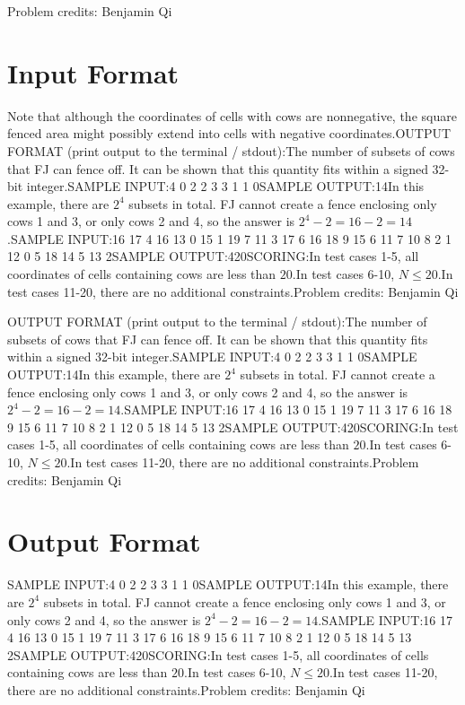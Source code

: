 \documentclass[12pt]{article}
\begin{document}
Problem credits: Benjamin Qi



\section*{Input Format}
Note that although the coordinates of cells with cows are nonnegative, the 
square fenced area might possibly extend into cells with negative coordinates.OUTPUT FORMAT (print output to the terminal / stdout):The number of subsets of cows that FJ can fence off. It can be shown that this
quantity fits within a signed 32-bit integer.SAMPLE INPUT:4
0 2
2 3
3 1
1 0SAMPLE OUTPUT:14In this example, there are $2^4$ subsets in total. FJ cannot create a fence enclosing only cows 1
and 3, or only cows 2 and 4, so the answer is $2^4-2=16-2=14$.SAMPLE INPUT:16
17 4
16 13
0 15
1 19
7 11
3 17
6 16
18 9
15 6
11 7
10 8
2 1
12 0
5 18
14 5
13 2SAMPLE OUTPUT:420SCORING:In test cases 1-5, all coordinates of cells containing cows are less than
$20$.In test cases 6-10, $N\le 20$.In test cases 11-20, there are no additional constraints.Problem credits: Benjamin Qi

OUTPUT FORMAT (print output to the terminal / stdout):The number of subsets of cows that FJ can fence off. It can be shown that this
quantity fits within a signed 32-bit integer.SAMPLE INPUT:4
0 2
2 3
3 1
1 0SAMPLE OUTPUT:14In this example, there are $2^4$ subsets in total. FJ cannot create a fence enclosing only cows 1
and 3, or only cows 2 and 4, so the answer is $2^4-2=16-2=14$.SAMPLE INPUT:16
17 4
16 13
0 15
1 19
7 11
3 17
6 16
18 9
15 6
11 7
10 8
2 1
12 0
5 18
14 5
13 2SAMPLE OUTPUT:420SCORING:In test cases 1-5, all coordinates of cells containing cows are less than
$20$.In test cases 6-10, $N\le 20$.In test cases 11-20, there are no additional constraints.Problem credits: Benjamin Qi

\section*{Output Format}
SAMPLE INPUT:4
0 2
2 3
3 1
1 0SAMPLE OUTPUT:14In this example, there are $2^4$ subsets in total. FJ cannot create a fence enclosing only cows 1
and 3, or only cows 2 and 4, so the answer is $2^4-2=16-2=14$.SAMPLE INPUT:16
17 4
16 13
0 15
1 19
7 11
3 17
6 16
18 9
15 6
11 7
10 8
2 1
12 0
5 18
14 5
13 2SAMPLE OUTPUT:420SCORING:In test cases 1-5, all coordinates of cells containing cows are less than
$20$.In test cases 6-10, $N\le 20$.In test cases 11-20, there are no additional constraints.Problem credits: Benjamin Qi
\end{document}
